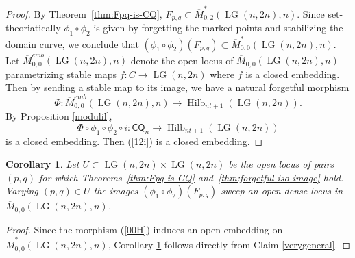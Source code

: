 \documentclass[10pt]{amsart}
\newtheorem{corollary}[theorem]{Corollary}
\theoremstyle{definition}
\newcommand{\Mbar}{\overline{M}}
\newcommand{\LG}{\operatorname{LG}}
\newcommand{\CQ}{\mathsf{CQ}}
\theoremstyle{plain} %
\begin{document}
\begin{proof}
By Theorem~\ref{thm:Fpq-is-CQ}, $F_{p,q}\subset\overline{M}_{0,2}^*(\LG(n,2n), n)$. Since set-theoriatically $\phi_1\circ\phi_2$ is given by forgetting the marked points and stabilizing the domain curve, we conclude that $(\phi_1\circ\phi_2)(F_{p,q})\subset\overline{M}_{0,0}^*(\LG(n,2n), n)$.
Let $\overline{M}_{0,0}^{emb}(\LG(n,2n), n)$ denote the open locus of $\overline{M}_{0,0}(\LG(n,2n), n)$ parametrizing stable maps $f\colon C\rightarrow\LG(n,2n)$ where $f$ is a closed embedding. Then by sending a stable map to its image, we have a natural forgetful morphism 
\begin{equation}\label{00H}
\Phi : \overline{M}_{0,0}^{emb}(\LG(n,2n), n) \longrightarrow \operatorname{Hilb}_{nt+1}(\LG(n,2n)).    
\end{equation}
By Proposition \ref{modulil},   \begin{equation*}
\Phi\circ\phi_1\circ\phi_2\circ i\colon \CQ_n\rightarrow \operatorname{Hilb}_{nt+1}(\LG(n,2n))   
\end{equation*}
is a closed embedding. Then (\ref{12i}) is a closed embedding.
\end{proof}



\begin{corollary}\label{swap}
Let $U\subset \LG(n,2n)\times \LG(n,2n)$ be the open locus of pairs $(p,q)$ for which
Theorems~\ref{thm:Fpq-is-CQ} and~\ref{thm:forgetful-iso-image} hold. Varying $(p,q)\in U$ the images $(\phi_1\circ\phi_2)(F_{p,q})$ sweep an open dense locus in $\Mbar_{0,0}(\LG(n,2n),n)$.
\end{corollary}
\begin{proof}
Since the morphism (\ref{00H}) induces an open embedding on $\overline{M}_{0,0}^*(\LG(n,2n), n)$, Corollary \ref{swap} follows directly from Claim \ref{verygeneral}.
\end{proof}
\end{document}
